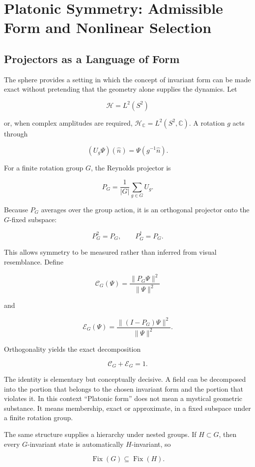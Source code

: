 \chapter{Platonic Symmetry: Admissible Form and Nonlinear Selection}

\section{Projectors as a Language of Form}

The sphere provides a setting in which the concept of invariant form can be made exact without pretending that the geometry alone supplies the dynamics. Let

\[
\mathcal H=L^2(S^2)
\]

or, when complex amplitudes are required, $\mathcal H_{\mathbb C}=L^2(S^2,\mathbb C)$. A rotation $g$ acts through

\[
(U_g\Psi)(\hat n)=\Psi(g^{-1}\hat n).
\]

For a finite rotation group $G$, the Reynolds projector is

\[
P_G=\frac1{|G|}\sum_{g\in G}U_g.
\]

Because $P_G$ averages over the group action, it is an orthogonal projector onto the $G$-fixed subspace:

\[
P_G^2=P_G,\qquad P_G^\dagger=P_G.
\]

This allows symmetry to be measured rather than inferred from visual resemblance. Define

\[
\mathscr C_G(\Psi)=\frac{\|P_G\Psi\|^2}{\|\Psi\|^2}
\]

and

\[
\mathscr E_G(\Psi)=\frac{\|(I-P_G)\Psi\|^2}{\|\Psi\|^2}.
\]

Orthogonality yields the exact decomposition

\[
\mathscr C_G+\mathscr E_G=1.
\]

The identity is elementary but conceptually decisive. A field can be decomposed into the portion that belongs to the chosen invariant form and the portion that violates it. In this context ``Platonic form'' does not mean a mystical geometric substance. It means membership, exact or approximate, in a fixed subspace under a finite rotation group.

The same structure supplies a hierarchy under nested groups. If $H\subset G$, then every $G$-invariant state is automatically $H$-invariant, so

\[
\operatorname{Fix}(G)\subseteq\operatorname{Fix}(H).
\]

